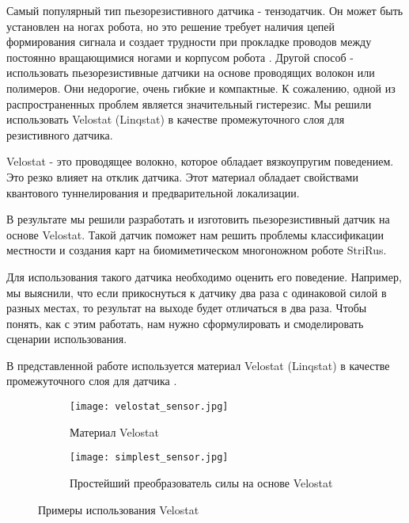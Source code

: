 Самый популярный тип пьезорезистивного датчика - тензодатчик. Он может быть установлен на ногах робота, но это решение требует наличия цепей формирования сигнала и создает трудности при прокладке проводов между постоянно вращающимися ногами и корпусом робота \cite{wu_tactile_2020}. Другой способ - использовать пьезорезистивные датчики на основе проводящих волокон или полимеров. Они недорогие, очень гибкие и компактные. К сожалению, одной из распространенных проблем является значительный гистерезис. Мы решили использовать Velostat (Linqstat)\cite{vehec_flexible_2020} в качестве промежуточного слоя для резистивного датчика.

Velostat - это проводящее волокно, которое обладает вязкоупругим поведением. Это резко влияет на отклик датчика. Этот материал обладает свойствами квантового туннелирования и предварительной локализации.

В результате мы решили разработать и изготовить пьезорезистивный датчик на основе Velostat. Такой датчик поможет нам решить проблемы классификации местности и создания карт на биомиметическом многоножном роботе StriRus. 

Для использования такого датчика необходимо оценить его поведение. Например, мы выяснили, что если прикоснуться к датчику два раза с одинаковой силой в разных местах, то результат на выходе будет отличаться в два раза. Чтобы понять, как с этим работать, нам нужно сформулировать и смоделировать сценарии использования.

В представленной работе используется материал Velostat (Linqstat)  в качестве промежуточного слоя для датчика .

\begin{figure}[h]
    \begin{subfigure}[t]{0.9\textwidth}
        \centering\texttt{[image: velostat\_sensor.jpg]}
        \caption{Материал Velostat}
        \label{fig:velostat_sensor.jpg}
    \end{subfigure}

    \begin{subfigure}[t]{0.95\textwidth}
        \centering\texttt{[image: simplest\_sensor.jpg]}
        \caption{Простейший преобразователь силы на основе Velostat}
        \label{fig:simplest_sensor.jpg}
    \end{subfigure}
    \caption{Примеры использования Velostat}
\end{figure}

